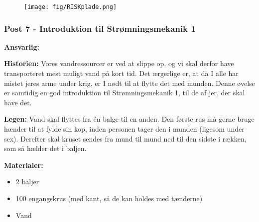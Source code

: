 \begin{figure}[H]
\begin{center}
\texttt{[image: fig/RISKplade.png]}
\end{center}
\end{figure}


\subsubsection*{Post 7 - Introduktion til Strømningsmekanik 1 }

\textbf{Ansvarlig:} \Mighty

\textbf{Historien:} Vores vandressourcer er ved at slippe op, og vi skal derfor have transporteret mest muligt vand på kort tid. Det ærgerlige er, at da I alle har mistet jeres arme under krig, er I nødt til at flytte det med munden. Denne øvelse er samtidig en god introduktion til Strømningsmekanik 1, til de af jer, der skal have det.

\textbf{Legen:} Vand skal flyttes fra én balge til en anden. Den første rus må gerne bruge hænder til at fylde sin kop, inden personen tager den i munden (ligesom under sex). Derefter skal kruset sendes fra mund til mund ned til den sidste i rækken, som så hælder det i baljen.

\textbf{Materialer:}
\begin{itemize}
  \item 2 baljer
  \item 100 engangskrus (med kant, så de kan holdes med tænderne)
  \item Vand
\end{itemize}

